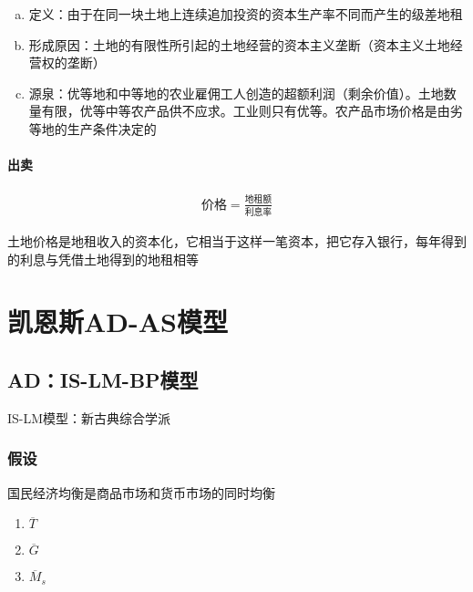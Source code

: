 \documentclass[12pt]{book}
\begin{document}
\begin{enumerate}[1.]
\begin{enumerate}[(1)]
\begin{enumerate}[a.]
                        \item 定义：由于在同一块土地上连续追加投资的资本生产率不同而产生的级差地租
                        \item 形成原因：土地的有限性所引起的土地经营的资本主义垄断（资本主义土地经营权的垄断）
                        \item 源泉：优等地和中等地的农业雇佣工人创造的超额利润（剩余价值）。土地数量有限，优等中等农产品供不应求。工业则只有优等。农产品市场价格是由劣等地的生产条件决定的
                    \end{enumerate}
          \end{enumerate}
\end{enumerate}











\subsubsection{出卖}

\begin{gather*}
    \text{价格}=\frac{\text{地租额}}{\text{利息率}}
\end{gather*}


土地价格是地租收入的资本化，它相当于这样一笔资本，把它存入银行，每年得到的利息与凭借土地得到的地租相等



\chapter{凯恩斯AD-AS模型}


\section{AD：IS-LM-BP模型}

IS-LM模型：新古典综合学派



\subsection{假设}
国民经济均衡是商品市场和货币市场的同时均衡

\begin{enumerate}[1.]
    \item $\overline{T}$
    \item $\overline{G}$
    \item $\overline{M}_s$ 
\end{enumerate}
\end{document}
